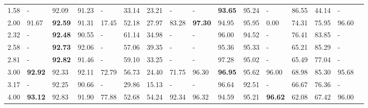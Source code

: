 \documentclass{article}
\theoremstyle{definition}
\theoremstyle{remark}
\begin{document}
\begin{table}[]
{\begin{tabular}{| p{0.87cm}|p{0.65cm}|p{0.7cm}|p{0.7cm}|p{0.65cm}|p{0.6cm}|p{0.6cm}|p{0.6cm}|p{0.65cm}|p{0.7cm}|p{0.7cm}|p{0.65cm}|p{0.6cm}|p{0.6cm}|p{0.6cm}|p{0.6cm}|}
1.58 & - & 92.09 & 91.23 & - & 33.14 & 23.21 & - & - & \textbf{93.65} & 95.24 & - & 86.55 & 44.14 & -\\

2.00	& 91.67&	\textbf{92.59}&	91.31&	17.45&	52.18&	27.97&	83.28&	\textbf{97.30}&	94.95&	95.95&	0.00&	74.31&	75.95&	96.60\\

2.32 & - & \textbf{92.48} & 90.55 & - & 61.14 & 34.98 & - & - & 96.00 & 94.52 & - & 76.41 & 83.85 & -\\

2.58 & - & \textbf{92.73} & 92.06& - & 57.06 & 39.35 & - & - & 95.36 & 95.33 & - & 65.21& 85.29 & -\\

2.81 & - & \textbf{92.82}& 91.46 & - & 59.10 & 33.25 & - & - & 97.28 & 95.02 & - & 65.49 & 77.04 & -\\

3.00	& \textbf{92.92}&	92.33&	92.11&	72.79&	56.73&	24.40&	71.75&	96.30&	\textbf{96.95}&	95.62&	96.00&	68.98&	85.30&	95.68\\

3.17 & - & 92.25 & 90.66 & - & 29.86 & 15.13 & - & - & 96.64 & 92.51 & - & 66.67 & 76.36 & -\\

4.00	& \textbf{93.12}&	92.83&	91.90&	77.88&	52.68&	54.24&	92.34&	96.32&	94.59&	95.21&	\textbf{96.62}&	62.08&	67.42&	96.00\\ \hline
    \end{tabular}}
    \end{table}


\end{document}
